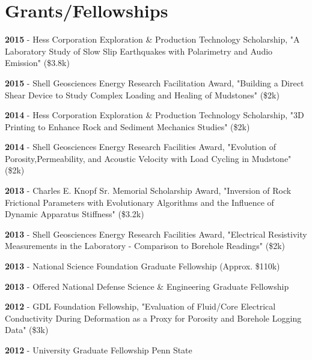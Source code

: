 \documentclass[letterpaper]{article}
\renewenvironment{itemize}{
  \begin{list}{}{
    \setlength{\leftmargin}{1.5em}
  }
}{
  \end{list}
}
\begin{document}
\section*{Grants/Fellowships}
\begin{itemize}
\item \textbf{2015} - Hess Corporation Exploration \& Production Technology Scholarship, "A Laboratory Study of Slow Slip Earthquakes with Polarimetry and Audio Emission" (\$3.8k)
\item \textbf{2015} - Shell Geosciences Energy Research Facilitation Award, "Building a Direct Shear Device to Study Complex Loading and Healing of Mudstones" (\$2k)
\item \textbf{2014} - Hess Corporation Exploration \& Production Technology Scholarship, "3D Printing to Enhance Rock and Sediment Mechanics Studies" (\$2k)
\item \textbf{2014} - Shell Geosciences Energy Research Facilities Award, "Evolution of Porosity,Permeability, and Acoustic Velocity with Load Cycling in Mudstone" (\$2k)
\item \textbf{2013} - Charles E. Knopf Sr. Memorial Scholarship Award, "Inversion of Rock Frictional Parameters with Evolutionary Algorithms and the Influence of Dynamic Apparatus Stiffness" (\$3.2k)
\item \textbf{2013} - Shell Geosciences Energy Research Facilities Award, "Electrical Resistivity Measurements in the Laboratory - Comparison to Borehole Readings" (\$2k)
\item \textbf{2013} - National Science Foundation Graduate Fellowship (Approx. \$110k)
\item \textbf{2013} - Offered National Defense Science \& Engineering Graduate Fellowship
\item \textbf{2012} - GDL Foundation Fellowship, "Evaluation of Fluid/Core Electrical Conductivity During Deformation as a Proxy for Porosity and Borehole Logging Data" (\$3k)
\item \textbf{2012} - University Graduate Fellowship Penn State
\end{itemize}
\end{document}
